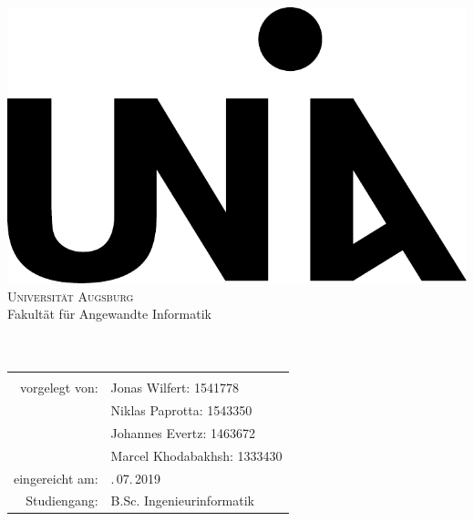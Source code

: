 %
%
%
%

\begin{titlepage}
\centering
\includegraphics[scale=0.4]{bilder/Uni_Aug_Logo_Basis_pos_A}\\[3ex]
{\Large \textsc{Universität Augsburg}}\\[3ex]
{\Large Fakultät für Angewandte Informatik}\\[3ex]
\vfill
{\Large \textbf{\artderausarbeitung}}\\[4ex]
{\large \textbf{\titelderarbeit}}\\[5ex]
\vfill
\begin{tabular}{rl}
\midrule \\
vorgelegt von:          & \quad Jonas Wilfert: 1541778\\
						& \quad Niklas Paprotta: 1543350\\
						& \quad Johannes Evertz: 1463672\\
						& \quad Marcel Khodabakhsh: 1333430\\[1,5ex]						
eingereicht am:         & \quad 30.\,07.\,2019\\[1,5ex]
Studiengang:            & \quad B.Sc. Ingenieurinformatik\\[1,5ex]


\end{tabular}
\end{titlepage}
